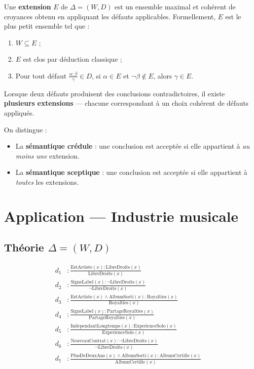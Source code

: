 Une \textbf{extension} $E$ de $\Delta = (W, D)$ est un ensemble maximal et
cohérent de croyances obtenu en appliquant les défauts applicables.
Formellement, $E$ est le plus petit ensemble tel que :
\begin{enumerate}
  \item $W \subseteq E$ ;
  \item $E$ est clos par déduction classique ;
  \item Pour tout défaut $\frac{\alpha:\beta}{\gamma} \in D$,
        si $\alpha \in E$ et $\lnot\beta \notin E$, alors $\gamma \in E$.
\end{enumerate}

\noindent Lorsque deux défauts produisent des conclusions contradictoires,
il existe \textbf{plusieurs extensions} — chacune correspondant à un choix
cohérent de défauts appliqués.

\noindent On distingue :
\begin{itemize}
  \item La \textbf{sémantique crédule} : une conclusion est acceptée si elle
        appartient à \emph{au moins une} extension.
  \item La \textbf{sémantique sceptique} : une conclusion est acceptée si elle
        appartient à \emph{toutes} les extensions.
\end{itemize}

\section{Application — Industrie musicale}

\subsection{Théorie $\Delta = (W, D)$}

\begin{tcolorbox}[defbox, title={Défauts $D$ — domaine musical}]
\begin{align*}
d_1 &: \frac{\text{EstArtiste}(x) : \text{LibreDroits}(x)}{\text{LibreDroits}(x)} \\[4pt]
d_2 &: \frac{\text{SigneLabel}(x) : \lnot\text{LibreDroits}(x)}{\lnot\text{LibreDroits}(x)} \\[4pt]
d_3 &: \frac{\text{EstArtiste}(x) \land \text{AlbumSorti}(x) : \text{Royalties}(x)}{\text{Royalties}(x)} \\[4pt]
d_4 &: \frac{\text{SigneLabel}(x) : \text{PartageRoyalties}(x)}{\text{PartageRoyalties}(x)} \\[4pt]
d_5 &: \frac{\text{IndependantLongtemps}(x) : \text{ExperienceSolo}(x)}{\text{ExperienceSolo}(x)} \\[4pt]
d_6 &: \frac{\text{NouveauContrat}(x) : \lnot\text{LibreDroits}(x)}{\lnot\text{LibreDroits}(x)} \\[4pt]
d_7 &: \frac{\text{PlusDeDeuxAns}(x) \land \text{AlbumSorti}(x) : \text{AlbumCertifie}(x)}{\text{AlbumCertifie}(x)}
\end{align*}
\end{tcolorbox}

